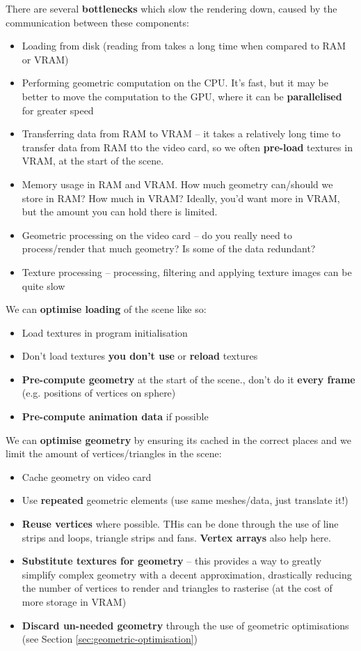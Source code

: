 \documentclass{article}
\begin{document}
There are several \textbf{bottlenecks} which slow the rendering down, caused by the communication between these components:
\begin{itemize}
	\item Loading from disk (reading from takes a long time when compared to RAM or VRAM)
	\item Performing geometric computation on the CPU. It's fast, but it may be better to move the computation to the GPU, where it can be \textbf{parallelised} for greater speed
	\item Transferring data from RAM to VRAM -- it takes a relatively long time to transfer data from RAM tto the video card, so we often \textbf{pre-load} textures in VRAM, at the start of the scene.
	\item Memory usage in RAM and VRAM. How much geometry can/should we store in RAM? How much in VRAM? Ideally, you'd want more in VRAM, but the amount you can hold there is limited.
	\item Geometric processing on the video card -- do you really need to process/render that much geometry? Is some of the data redundant?
	\item Texture processing -- processing, filtering and applying texture images can be quite slow
\end{itemize}

We can \textbf{optimise loading} of the scene like so:
\begin{itemize}
	\item Load textures in program initialisation
	\item Don't load textures \textbf{you don't use} or \textbf{reload} textures
	\item \textbf{Pre-compute geometry} at the start of the scene., don't do it \textbf{every frame} (e.g. positions of vertices on sphere)
	\item\textbf{Pre-compute animation data} if possible
\end{itemize}

We can \textbf{optimise geometry} by ensuring its cached in the correct places and we limit the amount of vertices/triangles in the scene:
\begin{itemize}
	\item Cache geometry on video card
	\item Use \textbf{repeated} geometric elements (use same meshes/data, just translate it!)
	\item \textbf{Reuse vertices} where possible. THis can be done through the use of line strips and loops, triangle strips and fans. \textbf{Vertex arrays} also help here.
	\item \textbf{Substitute textures for geometry} -- this provides a way to greatly simplify complex geometry with a decent approximation, drastically reducing the number of vertices to render and triangles to rasterise (at the cost of more storage in VRAM)
	\item \textbf{Discard un-needed geometry} through the use of geometric optimisations (see Section \ref{sec:geometric-optimisation})
\end{itemize}
\end{document}
